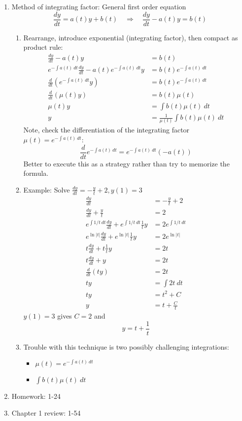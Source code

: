 \documentclass{article}
\newcommand{\ds}{\displaystyle}
\begin{document}
\begin{enumerate}
\item Method of integrating factor: General first order equation
\[
\frac{dy}{dt} = a(t)y + b(t) \quad \Rightarrow \quad \frac{dy}{dt} - a(t)y = b(t)
\]
\begin{enumerate}
\item Rearrange, introduce exponential (integrating factor), then compact as product rule:
\begin{align*}
\frac{dy}{dt} - a(t)y &= b(t) \\
e^{-\int a(t)~dt}\frac{dy}{dt} - a(t)e^{-\int a(t)~dt}y &= b(t)e^{-\int a(t)~dt} \\
\frac{d}{dt} \left(e^{-\int a(t)~dt} y \right) &= b(t) e^{-\int a(t)~dt} \\
\frac{d}{dt} \left(\mu(t) y \right) &= b(t) \mu(t) \\
\mu(t) y  &= \int b(t) \mu(t)~dt \\
y  &= \frac{1}{\mu(t)} \int b(t) \mu(t)~dt
\end{align*}
Note, check the differentiation of the integrating factor $\ds \mu(t) = e^{-\int a(t)~dt}$:
\[
\frac{d}{dt} e^{-\int a(t)~dt} = e^{-\int a(t)~dt}(-a(t))
\]
Better to execute this as a strategy rather than try to memorize the formula.
\item Example: Solve $\ds \frac{dy}{dt} = -\frac{y}{t}+2, y(1)=3$
\begin{align*}
\frac{dy}{dt} &= -\frac{y}{t}+2 \\
\frac{dy}{dt}+\frac{y}{t} &= 2 \\
e^{\int 1/t~dt}\frac{dy}{dt}+e^{\int 1/t~dt} \frac{1}{t}y &= 2e^{\int 1/t~dt} \\
e^{\ln|t|}\frac{dy}{dt}+e^{\ln|t|} \frac{1}{t}y &= 2e^{\ln|t|} \\
t \frac{dy}{dt}+ t \frac{1}{t}y &= 2t \\
t \frac{dy}{dt}+ y &= 2t \\
\frac{d}{dt} (ty) &= 2t \\
ty &= \int 2t ~dt \\
ty &= t^2+C \\
y &= t + \frac{C}{t}
\end{align*}
$y(1)=3$ gives $C=2$ and
\[
y = t + \frac{1}{t}
\]
\item Trouble with this technique is two possibly challenging integrations:
\begin{itemize}
\item $\ds \mu(t) = e^{-\int a(t)~dt}$
\item $\ds \int b(t)\mu(t)~dt$
\end{itemize}

\end{enumerate}

\item Homework: 1-24
\item Chapter 1 review: 1-54


\end{enumerate}
\end{document}
